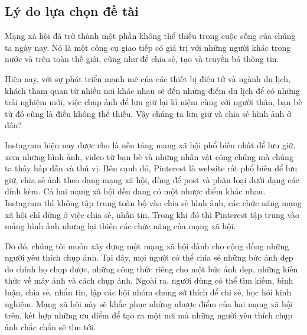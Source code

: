 \subsection{Lý do lựa chọn đề tài}
Mạng xã hội đã trờ thành một phần không thể thiếu trong cuộc sống của chúng ta ngày nay. 
Nó là một công cụ giao tiếp có giá trị với những người khác trong nước và trên toàn thế giới, cũng như để chia sẻ,
 tạo và truyền bá thông tin.\par 
Hiện nay, với sự phát triển mạnh mẽ của các thiết bị điện tử và ngành du lịch, khách tham quan từ nhiều nơi khác nhau 
sẽ đến những điểm du lịch để có những trải nghiệm mới, việc chụp ảnh để lưu giữ lại kỉ niệm cùng với người thân, bạn bè 
từ đó cũng là điều không thể thiếu. Vậy chúng ta lưu giữ và chia sẻ hình ảnh ở đâu?\par 
Instagram hiện nay được cho là nền tảng mạng xã hội phổ biến nhất để lưu giữ, xem những hình ảnh, video từ bạn bè và 
những nhân vật công chúng mà chúng ta thấy hấp dẫn và thú vị. Bên cạnh đó, Pinterest là website rất phổ biến để lưu giữ, 
chia sẻ ảnh theo dạng mạng xã hội, dùng để post và phân loại dưới dạng các đính kèm.
Cả hai mạng xã hội đều đang có một nhược điểm khác nhau. Instagram thì không tập trung toàn bộ vào chia sẻ hình ảnh, 
các chức năng mạng xã hội chỉ dừng ở việc chia sẻ, nhắn tin. Trong khi đó thì Pinterest tập trung vào mảng hình ảnh nhưng lại 
thiếu các chức năng của mạng xã hội.\par
Do đó, chúng tôi muốn xây dựng một mạng xã hội dành cho cộng đồng những người yêu thích chụp ảnh. Tại đây, mọi người 
có thể chia sẻ những bức ảnh đẹp do chính họ chụp được, những công thức riêng cho một bức ảnh đẹp, những kiến thức về máy ảnh 
và cách chụp ảnh. Ngoài ra, người dùng có thể tìm kiếm,  bình luận, chia sẻ, nhắn tin,  lập các hội nhóm chung sở thích để chi sẻ, 
học hỏi kinh nghiệm. Mạng xã hội này sẽ khắc phục nhửng nhược điểm của hai mạng xã hội trên, kết hợp những ưu điểm để tạo ra một nơi 
mà những người yêu thích chụp ảnh chắc chắn sẽ tìm tới.
